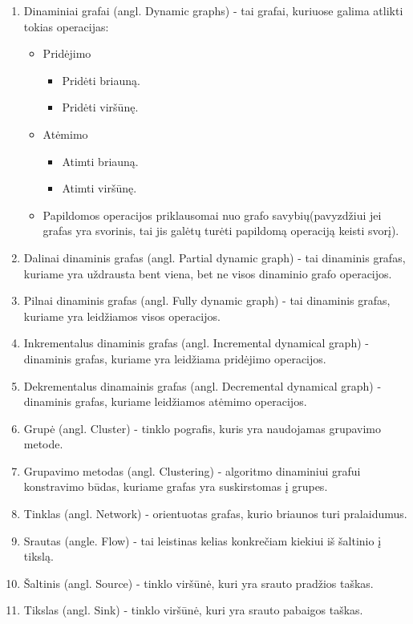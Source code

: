 \begin{enumerate}
	\item Dinaminiai grafai (angl. Dynamic graphs) - tai grafai, kuriuose galima atlikti tokias operacijas:
	\begin{itemize}
		\item Pridėjimo
		\begin{itemize}
			\item Pridėti briauną.
			\item Pridėti viršūnę.
		\end{itemize}
		\item Atėmimo
		\begin{itemize}
			\item Atimti briauną.
			\item Atimti viršūnę.
		\end{itemize}
		\item  Papildomos operacijos priklausomai nuo grafo savybių(pavyzdžiui jei grafas yra svorinis, tai jis galėtų turėti papildomą operaciją keisti svorį).
	\end{itemize}
	\item Dalinai dinaminis grafas (angl. Partial dynamic graph) - tai dinaminis grafas, kuriame yra uždrausta bent viena, bet ne visos dinaminio grafo operacijos.
	\item Pilnai dinaminis grafas (angl. Fully dynamic graph) - tai dinaminis grafas, kuriame yra leidžiamos visos operacijos.
	\item Inkrementalus dinaminis grafas (angl. Incremental dynamical graph) - dinaminis grafas, kuriame yra leidžiama pridėjimo operacijos.
	\item Dekrementalus dinamainis grafas (angl. Decremental dynamical graph) - dinaminis grafas, kuriame leidžiamos atėmimo operacijos.
	\item Grupė (angl. Cluster) - tinklo pografis, kuris yra naudojamas grupavimo metode.
	\item Grupavimo metodas (angl. Clustering) - algoritmo dinaminiui grafui konstravimo būdas, kuriame grafas yra suskirstomas į grupes.
	\item Tinklas (angl. Network) - orientuotas grafas, kurio briaunos turi pralaidumus.
	\item Srautas (angle. Flow) - tai leistinas kelias konkrečiam kiekiui iš šaltinio į tikslą.
	\item Šaltinis (angl. Source) - tinklo viršūnė, kuri yra srauto pradžios taškas.
	\item Tikslas (angl. Sink) - tinklo viršūnė, kuri yra srauto pabaigos taškas.

\end{enumerate}
